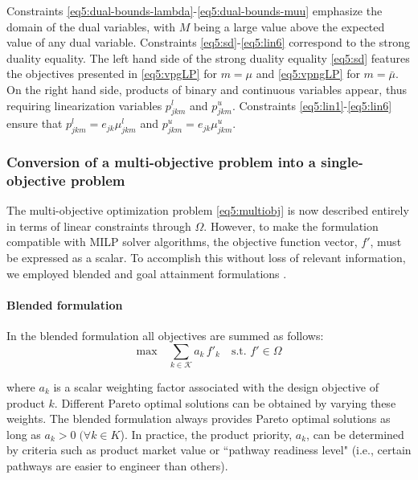 Constraints \eqref{eq5:dual-bounds-lambda}-\eqref{eq5:dual-bounds-muu} emphasize the domain of the dual variables, with $M$ being a large value above the expected value of any dual variable.
Constraints \eqref{eq5:sd}-\eqref{eq5:lin6} correspond to the strong duality equality. The left hand side of the strong duality equality \eqref{eq5:sd} features the objectives presented in \eqref{eq5:vpgLP} for $m=\mu$ and \eqref{eq5:vpngLP} for $m=\bar{\mu}$. On the right hand side, products of binary and continuous variables appear, thus requiring linearization variables $p_{jkm}^l$ and $p_{jkm}^u$. Constraints \eqref{eq5:lin1}-\eqref{eq5:lin6} ensure that $p_{jkm}^l=e_{jk} \mu_{jkm}^l$ and $p_{jkm}^u = e_{jk} \mu_{jkm}^u$.

\subsubsection{Conversion of a multi-objective problem into a single-objective problem}

The multi-objective optimization problem \eqref{eq5:multiobj} is now described entirely in terms of linear constraints through $\Omega$.
However, to make the formulation compatible with MILP solver algorithms, the objective function vector, $f'$, must be expressed as a scalar. To accomplish this without loss of relevant information, we employed blended and goal attainment formulations \citep{marler2004}.

\paragraph{Blended formulation}
In the blended formulation all objectives are summed as follows:
\begin{equation}
\underset{}{\text{max}} \quad \sum_{k\in \mathcal{K}} a_k\, f'_k  \quad  \text{s.t. } f' \in \Omega \label{eq5:blended}
\end{equation}

\noindent where $a_k$ is a scalar weighting factor associated with the design objective of product $k$.  Different Pareto optimal solutions can be obtained by varying these weights. The blended formulation always provides Pareto optimal solutions as long as $a_k>0 \; (\forall k\in K$). In practice, the product priority, $a_k$, can be determined by criteria such as product market value or ``pathway readiness level" (i.e., certain pathways are easier to engineer than others).

